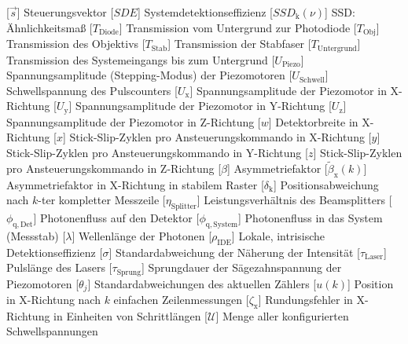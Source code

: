 \begin{acronym}[acronyms]
[\ensuremath{\vec{s}}]{ Steuerungsvektor}
[\ensuremath{SDE}]{\acrounit{} Systemdetektionseffizienz}
[\ensuremath{SSD_\mathrm{k}(\nu)}]{ \acl{SSD}: Ähnlichkeitsmaß}
[\ensuremath{T_\mathrm{Diode}}]{\acrounit{} Transmission vom Untergrund zur Photodiode}
[\ensuremath{T_\mathrm{Obj}}]{\acrounit{} Transmission des Objektivs}
[\ensuremath{T_\mathrm{Stab}}]{\acrounit{} Transmission der Stabfaser}
[\ensuremath{T_\mathrm{Untergrund}}]{\acrounit{} Transmission des Systemeingangs bis zum Untergrund}
[\ensuremath{U_\mathrm{Piezo}}]{ Spannungsamplitude (Stepping-Modus) der Piezomotoren}
[\ensuremath{U_\mathrm{Schwell}}]{ Schwellspannung des Pulscounters}
[\ensuremath{U_\mathrm{x}}]{ Spannungsamplitude der Piezomotor in X-Richtung}
[\ensuremath{U_\mathrm{y}}]{ Spannungsamplitude der Piezomotor in Y-Richtung}
[\ensuremath{U_\mathrm{z}}]{ Spannungsamplitude der Piezomotor in Z-Richtung}
[\ensuremath{w}]{ Detektorbreite in X-Richtung}
[\ensuremath{x}]{ Stick-Slip-Zyklen pro Ansteuerungskommando in X-Richtung}
[\ensuremath{y}]{ Stick-Slip-Zyklen pro Ansteuerungskommando in Y-Richtung}
[\ensuremath{z}]{ Stick-Slip-Zyklen pro Ansteuerungskommando in Z-Richtung}
[\ensuremath{\beta}]{\acrounit{} Asymmetriefaktor}
[\ensuremath{\tilde\beta_\mathrm{x}(k)}]{\acrounit{} Asymmetriefaktor in X-Richtung in stabilem Raster}
[\ensuremath{\delta_\mathrm{k}}]{ Positionsabweichung nach $k$-ter kompletter Messzeile}
[\ensuremath{\eta_\mathrm{Splitter}}]{\acrounit{} Leistungsverhältnis des Beamsplitters}
[\ensuremath{\phi_\mathrm{q,Det}}]{ Photonenfluss auf den Detektor}
[\ensuremath{\phi_\mathrm{q,System}}]{ Photonenfluss in das System (Messstab)}
[\ensuremath{\lambda}]{ Wellenlänge der Photonen}
[\ensuremath{\rho_\mathrm{IDE}}]{ Lokale, intrisische Detektionseffizienz}
[\ensuremath{\sigma}]{ Standardabweichung der Näherung der Intensität}
[\ensuremath{\tau_\mathrm{Laser}}]{ Pulslänge des Lasers}
[\ensuremath{\tau_\mathrm{Sprung}}]{ Sprungdauer der Sägezahnspannung der Piezomotoren}
[\ensuremath{\theta_j}]{\acrounit{} Standardabweichungen des aktuellen Zählers}
[\ensuremath{u(k)}]{ Position in X-Richtung nach $k$ einfachen Zeilenmessungen}
[\ensuremath{\zeta_\mathrm{x}}]{\acrounit{} Rundungsfehler in X-Richtung in Einheiten von Schrittlängen}
[\ensuremath{\mathcal{U}}]{\acrounit{} Menge aller konfigurierten Schwellspannungen}
\end{acronym}
